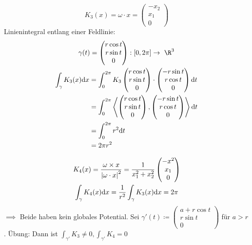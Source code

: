 \begin{bsp*}[note = 3]
	\[ K_3(x) = \omega \cdot x = \begin{pmatrix} -x_2 \\ x_1 \\ 0 \end{pmatrix} \]
	Linienintegral entlang einer Feldlinie:
	\begin{gather*}
		\gamma(t) = \begin{pmatrix} r \cos t \\ r \sin t \\ 0 \end{pmatrix} : [0 , 2\pi] \rightarrow \R^3 \\
		\begin{split}
			\int_{\gamma} K_3(x) \dd x
				&= \int_0^{2\pi} K_3\begin{pmatrix} r \cos t \\ r \sin t \\ 0 \end{pmatrix} \cdot \begin{pmatrix} -r \sin t \\ r \cos t \\ 0 \end{pmatrix} \dd t \\
				&= \int_0^{2\pi} \left\langle \begin{pmatrix} r \cos t \\ r \sin t \\ 0 \end{pmatrix} , \begin{pmatrix} -r \sin t \\ r \cos t \\ 0 \end{pmatrix} \right\rangle \dd t \\
				&= \int_0^{2\pi} r^2 \dd t \\
				&= 2\pi r^2
		\end{split}
	\end{gather*}
\end{bsp*}
\begin{bsp*}[note = 4]
	\begin{gather*}
		K_4(x) = \frac{\omega \times x}{\abs{\omega \cdot x}^2} = \frac{1}{x_1^2 + x_2^2} \begin{pmatrix} -x^2 \\ x_1 \\ 0 \end{pmatrix} \\
		\int_{\gamma} K_4(x) \dd x = \frac{1}{r^2} \int_{\gamma} K_3(x) \dd x = 2\pi
	\end{gather*}
	$\implies$ Beide haben kein globales Potential.
	Sei $\gamma'(t) \coloneqq \begin{pmatrix} a + r \cos t \\ r \sin t \\ 0 \end{pmatrix}$ für $a > r$. Übung: Dann ist $\int_{\gamma'} K_3 \neq 0 , \int_{\gamma'} K_4 = 0$
\end{bsp*}

